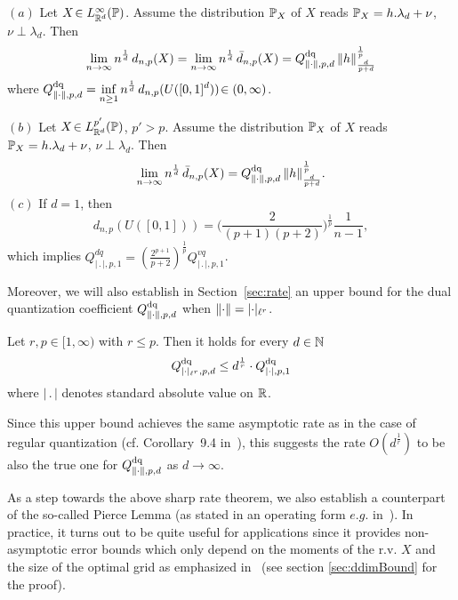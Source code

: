 \begin{thm}\label{thm:DQRate} $(a)$ 
Let $X\!\in L_{\mathbb{R}^d}^{\infty}(\mathbb{P})$. Assume the distribution $\mathbb{P}_X$ of
$X$ reads $\mathbb{P}_X= h.\lambda_d+\nu$, $\nu\perp\lambda_d$. Then
\[
\lim_{n\to\infty} n^{\frac 1d}\, d_{n,p}(X) 
= \lim_{n\to\infty} n^{\frac 1d}\, \bar d_{n,p}(X)
= Q^{\text{dq}}_{\lVert\cdot\rVert, p, d}\,\|h\|_{\frac{d}{p+d}}^{\frac 1p}
\] 
where $\displaystyle Q^{\text{dq}}_{\lVert\cdot\rVert, p, d}= \inf_{n\ge 1} n^{\frac 1d}\, d_{n,p}(U([0,1]^d))\!\in
(0,\infty)$.

\noindent $(b)$  Let $X\!\in L_{\mathbb{R}^d}^{p'}(\mathbb{P})$, $p'>p$. Assume the
distribution $\mathbb{P}_X$ of $X$ reads $\mathbb{P}_X= h.\lambda_d+\nu$,
$\nu\perp\lambda_d$. Then
\[
\lim_{n\to\infty} n^{\frac 1d}\, \bar d_{n,p}(X) 
= Q^{\text{dq}}_{\lVert\cdot\rVert, p, d}\,\|h\|_{\frac{d}{p+d}}^{\frac 1p}.
\] 
\noindent $(c)$ If $d=1$, then 
\[
d_{n,p}(U([0,1])) = \biggl(\frac{2}{(p+1)(p+2)} \biggr)^{\frac 1p}
\frac{1}{n-1},
\]  
which implies $Q^{dq}_{|\,.\,|,p,1}=\left(\frac{2^{p+1}}{p+2}\right)^{\frac
1p}Q^{vq}_{|\,.\,|,p,1}$.
\end{thm}

Moreover, we will also establish in Section~\ref{sec:rate} an upper bound for the
dual quantization coefficient $Q^{\text{dq}}_{\lVert\cdot\rVert, p, d}$ when $\lVert\cdot\rVert =
\lvert\cdot\rvert_{\ell^r}$.
\begin{prop}\label{prop:asymptQ}
Let $r,p\in[1,\infty)$ with $r\leq p$.
Then it holds for every $d\in\mathbb{N}$
\[
	Q^{\text{dq}}_{\lvert\cdot\rvert_{\ell^r}, p, d} \leq d^{\frac{1}{r}}\cdot
	Q^{\text{dq}}_{\lvert\cdot\rvert, p, 1}
\]
where $|\,.\,|$ denotes standard absolute value on $\mathbb{R}$.\end{prop}

Since this upper bound achieves the same asymptotic rate as in the case of
regular quantization (cf. Corollary~9.4 in~\cite{Foundations}), this suggests the rate
 $O(d^\frac{1}{r})$ to be also the true one for $Q^{\text{dq}}_{\lVert\cdot\rVert, p, d}$ as $d\to\infty$.

As a step towards the above sharp rate theorem, we  also establish a counterpart
of the so-called Pierce Lemma (as stated in an operating form $e.g.$ 
in~\cite{meanRegular}). 
In practice, it turns out to be quite  useful for applications since it provides 
non-asymptotic error bounds which  only depend on the moments of the r.v. $X$
and the size of the optimal grid as emphasized in~\cite{dualAppl} (see section
\ref{sec:ddimBound} for the proof).

